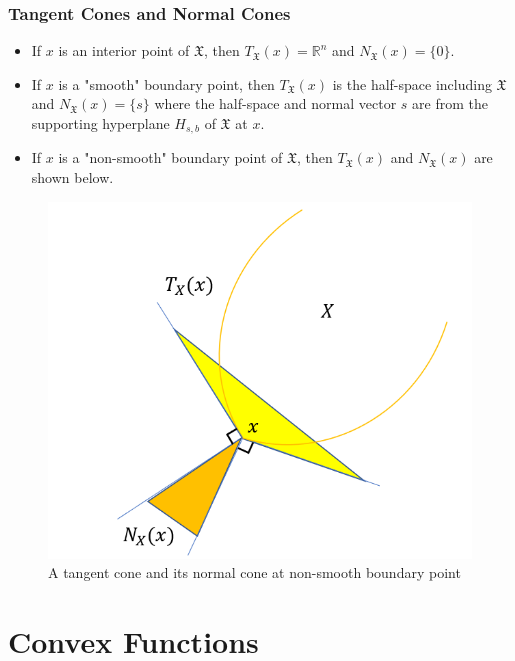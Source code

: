 \begin{frame}\frametitle{Tangent Cones and Normal Cones}
    \begin{itemize}
        \item If $x$ is an interior point of $\mathfrak{X}$, then $T_\mathfrak{X}(x) = \mathbb{R}^n$ and $N_\mathfrak{X}(x)=\{0\}$.
        \item If $x$ is a "smooth" boundary point, then $T_\mathfrak{X}(x)$ is the half-space including $\mathfrak{X}$ and $N_\mathfrak{X}(x)=\{s\}$ where the half-space and normal vector $s$ are from the supporting hyperplane $H_{s,b}$ of $\mathfrak{X}$ at $x$.
        \item If $x$ is a "non-smooth" boundary point of $\mathfrak{X}$, then $T_\mathfrak{X}(x)$ and $N_\mathfrak{X}(x)$ are shown below.
    \end{itemize}

    \begin{figure}
    \includegraphics[scale=0.3]{./figures/tangent_cone.png}
    \caption{A tangent cone and its normal cone at non-smooth boundary point}
    \end{figure}
\end{frame}


\section{Convex Functions}


